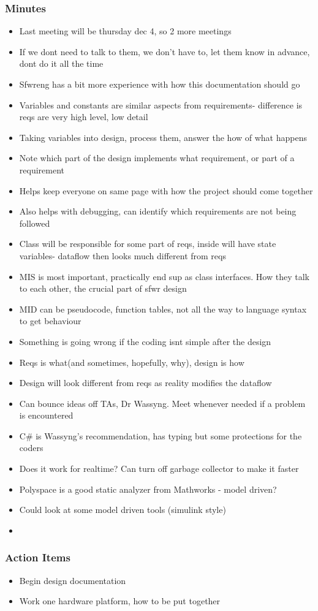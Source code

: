 		\subsubsection*{Minutes}
			\begin{itemize}
				\item Last meeting will be thursday dec 4, so 2 more meetings
				\item If we dont need to talk to them, we don't have to, let them know in advance, dont do it all the time
				\item Sfwreng has a bit more experience with how this documentation should go 
				\item Variables and constants are similar aspects from requirements- difference is reqs are very high level, low detail
				\item Taking variables into design, process them, answer the how of what happens
				\item Note which part of the design implements what requirement, or part of a requirement
				\item Helps keep everyone on same page with how the project should come together
				\item Also helps with debugging, can identify which requirements are not being followed
				\item Class will be responsible for some part of reqs, inside will have state variables- dataflow then looks much different from reqs 
				\item MIS is most important, practically end sup as class interfaces. How they talk to each other, the crucial part of sfwr design
				\item MID can be pseudocode, function tables, not all the way to language syntax to get behaviour
				\item Something is going wrong if the coding isnt simple after the design
				\item Reqs is what(and sometimes, hopefully, why), design is how
				\item Design will look different from reqs as reality modifies the dataflow
				\item Can bounce ideas off TAs, Dr Wassyng. Meet whenever needed if a problem is encountered
				\item C\# is Wassyng's recommendation, has typing but some protections for the coders
				\item Does it work for realtime? Can turn off garbage collector to make it faster
				\item Polyspace is a good static analyzer from Mathworks - model driven?
				\item Could look at some model driven tools (simulink style)
				\item 
			\end{itemize}

		\subsubsection*{Action Items}
			\begin{itemize}
				\item Begin design documentation
				\item Work one hardware platform, how to be put together
			\end{itemize}



